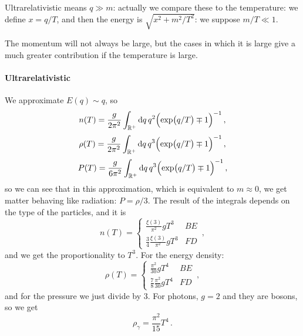 \documentclass[main.tex]{subfiles}
\begin{document}
Ultrarelativistic means \(q \gg m\): actually we compare these to the temperature: we define \(x = q/T\), and then the energy is \(\sqrt{x^2+ m^2/T^2} \): we suppose \( m/T \ll 1\).

The momentum will not always be large, but the cases in which it is large give a much greater contribution if the temperature is large.

\paragraph{Ultrarelativistic}

We approximate \(E(q) \sim q\), so  
%
\begin{equation}
  n(T) = \frac{g}{2 \pi^2} \int _{\mathbb{R}^{+}} \dd{q} q^2 \qty(\exp(q/T) \mp 1 )^{-1} 
\,,
\end{equation}
%
%
\begin{equation}
    \rho (T) = \frac{g}{2 \pi^2} \int _{\mathbb{R}^{+}} \dd{q} q^3 \qty(\exp(q/T) \mp 1 )^{-1} 
  \,,
\end{equation}
%
\begin{equation}
    P (T) = \frac{g}{6 \pi^2} \int _{\mathbb{R}^{+}} \dd{q} q^3 \qty(\exp(q/T) \mp 1 )^{-1} 
\,,
\end{equation}
%
so we can see that in this approximation, which is equivalent to \(m \approx 0\), we get matter behaving like radiation: \(P = \rho /3\).  
The result of the integrals depends on the type of the particles, and it is 
%
\begin{equation}
  n(T) = \begin{cases}
      \frac{\xi (3)}{\pi^2} g T^3 & BE  \\
      \frac{3}{4}\frac{\xi (3)}{\pi^2} g T^3 & FD  
  \end{cases}
\,,
\end{equation}
%
and we get the proportionality to \(T^3\).
For the energy density:
\begin{equation}
    \rho (T) = \begin{cases}
        \frac{\pi^2}{30} g T^4 & BE  \\
        \frac{7}{8}\frac{\pi^2}{30} g T^4 & FD  
    \end{cases}
  \,,
\end{equation}
and for the pressure we just divide by 3.
For photons, \(g=2\) and they are bosons, so we get 
%
\begin{equation}
  \rho _\gamma  = \frac{\pi^2}{15} T^{4}
\,.
\end{equation}
\end{document}

